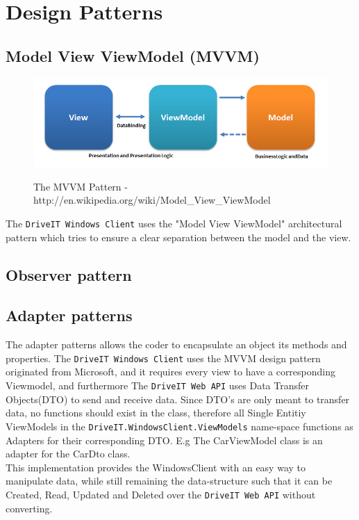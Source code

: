 \section{Design Patterns}
\subsection{Model View ViewModel (MVVM)}
\begin{figure}[H]
	\centering
	\includegraphics[scale=0.6]{Figures/WebImages/MVVMPattern}\\
	\caption{The MVVM Pattern - http://en.wikipedia.org/wiki/Model\_View\_ViewModel}
	\label{fig:MVVMPattern}
\end{figure}
The \texttt{DriveIT Windows Client} uses the "Model View ViewModel" architectural pattern which tries to ensure a clear separation between the model and the view. 
\subsection{Observer pattern}

\subsection{Adapter patterns}
The adapter patterns allows the coder to encapsulate an object its methods and properties. The \texttt{DriveIT Windows Client} uses the MVVM design pattern originated from Microsoft, and it requires every view to have a corresponding Viewmodel, and furthermore The \texttt{DriveIT Web API} uses Data Transfer Objects(DTO) to send and receive data. Since DTO's are only meant to transfer data, no functions should exist in the class, therefore all Single Entitiy ViewModels in the \texttt{DriveIT.WindowsClient.ViewModels} name-space functions as Adapters for their corresponding DTO. E.g The CarViewModel class is an adapter for the CarDto class.\\ 

This implementation provides the WindowsClient with an easy way to manipulate data, while still remaining the data-structure such that it can be Created, Read, Updated and Deleted over the \texttt{DriveIT Web API} without converting.